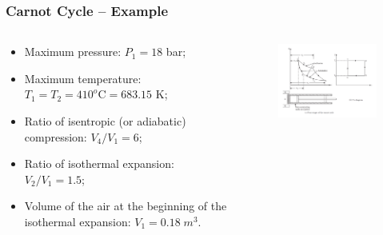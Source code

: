 \documentclass[10pt,compress]{beamer}
\begin{document}
\begin{frame}
 \frametitle{Carnot Cycle -- Example}
  \begin{columns}
   \begin{column}[c]{0.4\linewidth}
    \begin{itemize}
     \item Maximum pressure: $P_{1}=18$ bar;
     \item Maximum temperature: $T_{1}=T_{2}=410^{o}\text{C}=683.15\text{ K}$;
     \item Ratio of isentropic (or adiabatic) compression: $V_{4}/V_{1}=6$;
     \item Ratio of isothermal expansion: $V_{2}/V_{1}=1.5$;
     \item Volume of the air at the beginning of the isothermal expansion: $V_{1}=0.18\;m^{3}$.
    \end{itemize}
    \end{column}
    \begin{column}[c]{0.6\linewidth}
     \begin{figure}%
      \begin{center}
     \includegraphics[width=7.5cm,clip]{./Pics/GasCycle_CarnotCycle}
    \end{center}
   \end{figure}  
  \end{column}  
 \end{columns}
\end{frame}
\end{document}
